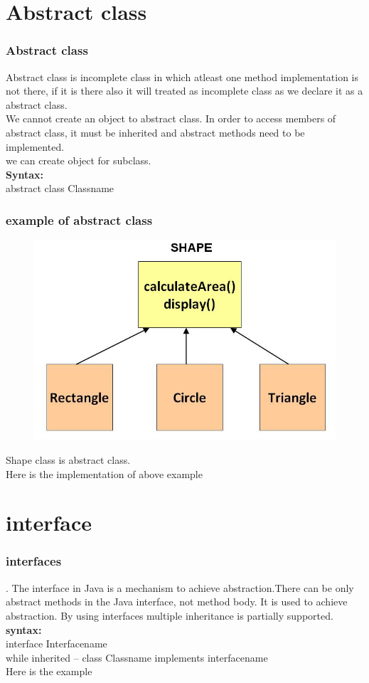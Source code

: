 \documentclass{beamer}
\begin{document}
\section{Abstract class}
\begin{frame}
    \frametitle{Abstract class}
    Abstract class is incomplete class in which atleast one method implementation is not there, if it is there also it will treated as incomplete class as we declare it as a abstract class.\\
    We cannot create an object to abstract class. In order to access members of abstract class, it must be inherited and abstract methods need to be implemented.\\
    we can create object for subclass.\\
    \textbf{Syntax:}\\
    abstract class Classname 
\end{frame}
\begin{frame}
    \frametitle{example of abstract class}
    \begin{figure}[H]
        \includegraphics[scale=0.3]{images/java-abstract-classes.jpg}
    \end{figure}
    Shape class is abstract class.\\ 
    Here is the implementation of above example \href{abstract_class.java}{\color{green}{area of shape}} 
\end{frame}
\section{interface}
\begin{frame}
    \frametitle{interfaces}.
    The interface in Java is a mechanism to achieve abstraction.There can be only abstract methods in the Java interface, not method body. It is used to achieve abstraction. By using interfaces multiple inheritance is partially supported.\\
    \textbf{syntax:}\\
    interface Interfacename\\
    while inherited -- class Classname implements interfacename \\
    Here is the example \href{interface_example.java}{\color{green}{interface}}
\end{frame}
\end{document}

